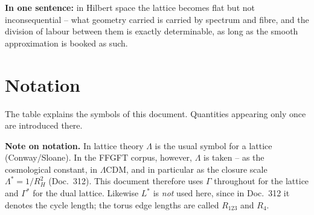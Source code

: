 \medskip
\noindent\textbf{In one sentence:} in Hilbert space the lattice
becomes flat but not inconsequential -- what geometry carried is
carried by spectrum and fibre, and the division of labour between
them is exactly determinable, as long as the smooth approximation is
booked as such.

\section*{Notation}

The table explains the symbols of this document. Quantities
appearing only once are introduced there.

\textbf{Note on notation.} In lattice theory $\Lambda$ is the usual
symbol for a lattice (Conway/Sloane). In the FFGFT corpus, however,
$\Lambda$ is taken -- as the cosmological constant, in
$\Lambda$CDM, and in particular as the closure scale
$\Lambda^{*} = 1/R_H^2$ (Doc.~312). This document therefore uses
$\Gamma$ throughout for the lattice and $\Gamma^{*}$ for the dual
lattice. Likewise $L^{*}$ is \emph{not} used here, since in
Doc.~312 it denotes the cycle length; the torus edge lengths are
called $R_{123}$ and $R_4$.

